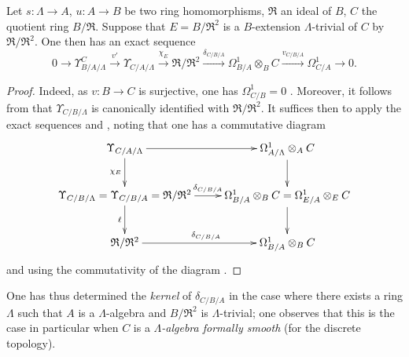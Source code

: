 \begin{proposition}[20.6.22]
\label{0.20.6.22}
Let $s:\Lambda\to A$, $u:A\to B$ be two ring homomorphisms, $\mathfrak{R}$ an ideal of $B$, $C$ the quotient ring $B/\mathfrak{R}$.
Suppose that $E=B/\mathfrak{R}^2$ is a $B$-extension $\Lambda$-trivial of $C$ by $\mathfrak{R}/\mathfrak{R}^2$.
One then has an exact sequence
\begin{equation}
\tag{20.6.22.1}
  \label{0.20.6.22.1}
  0\to\Upsilon^C_{B/A/\Lambda}\xrightarrow{v'}\Upsilon_{C/A/\Lambda}\xrightarrow{\chi_E}\mathfrak{R}/\mathfrak{R}^2\xrightarrow{\delta_{C/B/A}}\Omega^1_{B/A}\otimes_B C\xrightarrow{v_{C/B/A}}\Omega^1_{C/A}\to 0.
\end{equation}
\end{proposition}

\begin{proof}
Indeed, as $v:B\to C$ is surjective, one has $\Omega^1_{C/B}=0$ .
Moreover, it follows from  that $\Upsilon_{C/B/\Lambda}$ is canonically identified with $\mathfrak{R}/\mathfrak{R}^2$.
It suffices then to apply the exact sequences  and , noting that one has a commutative diagram
\[
\xymatrix{
  \Upsilon_{C/A/\Lambda} \ar[r] \ar[d]_{\chi_E} & \Omega^1_{A/\Lambda}\otimes_A C \ar[d] \\
  \Upsilon_{C/B/\Lambda}=\Upsilon_{C/B/A}=\mathfrak{R}/\mathfrak{R}^2 \ar[r]^-{\delta_{C/B/A}} \ar[d]_{\ell} & \Omega^1_{B/A}\otimes_B C=\Omega^1_{E/A}\otimes_E C \ar[d] \\
  \mathfrak{R}/\mathfrak{R}^2 \ar[r]^{\delta_{C/B/A}} & \Omega^1_{B/A}\otimes_B C
}
\]
and using the commutativity of the diagram .
\end{proof}

One has thus determined the \emph{kernel} of $\delta_{C/B/A}$ in the case where there exists a ring $\Lambda$ such that $A$ is a $\Lambda$-algebra and $B/\mathfrak{R}^2$ is $\Lambda$-trivial; one observes that this is the case in particular when $C$ is a \emph{$\Lambda$-algebra formally smooth} (for the discrete topology).

